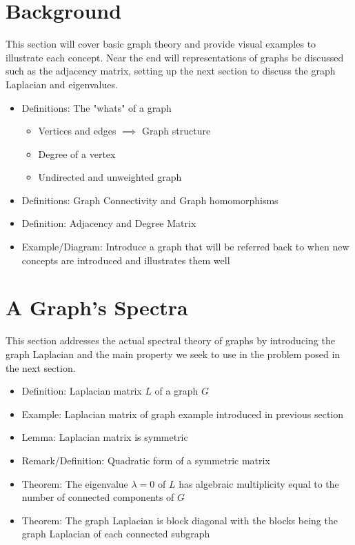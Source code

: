 \documentclass{article}
\begin{document}
\bigskip

\section{Background}

This section will cover basic graph theory and provide visual examples to illustrate each concept. Near the end will representations of graphs be discussed such as the adjacency matrix, setting up the next section to discuss the graph Laplacian and eigenvalues.

\begin{itemize}
    \item Definitions: The "whats" of a graph
        \begin{itemize}
            \item Vertices and edges $\implies$ Graph structure
            \item Degree of a vertex
            \item Undirected and unweighted graph
        \end{itemize}
    \item Definitions: Graph Connectivity and Graph homomorphisms
    \item Definition: Adjacency and Degree Matrix
    \item Example/Diagram: Introduce a graph that will be referred back to when new concepts are introduced and illustrates them well
\end{itemize}
\bigskip

\section{A Graph's Spectra}

This section addresses the actual spectral theory of graphs by introducing the graph Laplacian and the main property we seek to use in the problem posed in the next section.

\begin{itemize}
    \item Definition: Laplacian matrix $L$ of a graph $G$
    \item Example: Laplacian matrix of graph example introduced in previous section
    \item Lemma: Laplacian matrix is symmetric
    \item Remark/Definition: Quadratic form of a symmetric matrix
    \item Theorem: The eigenvalue $\lambda = 0$ of $L$ has algebraic multiplicity equal to the number of connected components of $G$
    \item Theorem: The graph Laplacian is block diagonal with the blocks being the graph Laplacian of each connected subgraph
\end{itemize}
\bigskip
\end{document}
